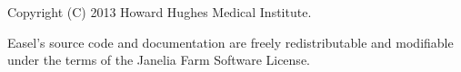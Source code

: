 \vspace*{\fill}
\begin{flushleft}
Copyright (C) 2013 Howard Hughes Medical Institute.

\vspace{2em} 

Easel's source code and documentation are freely redistributable and
modifiable under the terms of the Janelia Farm Software License.
\end{flushleft}








